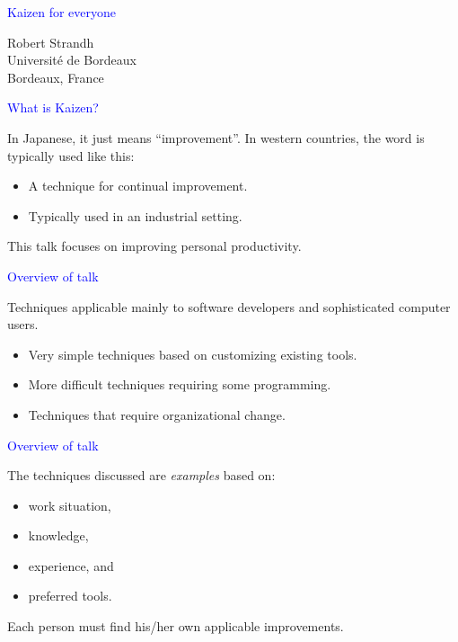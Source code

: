 \documentclass{slides}
\newcommand{\ti}[1]{\begin{center}\Large{\textcolor{blue}{#1}}\end{center}}
\begin{document}
\landscape
\setlength{\oddsidemargin}{1cm}
\setlength{\evensidemargin}{1cm}
\setlength{\marginparwidth}{1cm}
\setlength{\parskip}{0.5cm}
\setlength{\parindent}{0cm}
\begin{slide}\ti{Kaizen for everyone}
\vskip 0.5cm
\begin{center}
Robert Strandh \\
Université de Bordeaux \\
Bordeaux, France
\end{center}
\vfill\end{slide}
\begin{slide}\ti{What is Kaizen?}

In Japanese, it just means ``improvement''.  In western countries, the
word is typically used like this:

  \begin{itemize}
  \item A technique for continual improvement.
  \item Typically used in an industrial setting.
  \end{itemize}

This talk focuses on improving personal productivity.

\vfill\end{slide}
\begin{slide}\ti{Overview of talk}

Techniques applicable mainly to software developers and sophisticated
computer users.

  \begin{itemize}
  \item Very simple techniques based on customizing existing tools.
  \item More difficult techniques requiring some programming.
  \item Techniques that require organizational change.
  \end{itemize}

\vfill\end{slide}
\begin{slide}\ti{Overview of talk}

The techniques discussed are \emph{examples} based on:

\begin{itemize}
\item work situation,
\item knowledge,
\item experience, and
\item preferred tools.
\end{itemize}

Each person must find his/her own applicable improvements.

\vfill\end{slide}
\end{document}
